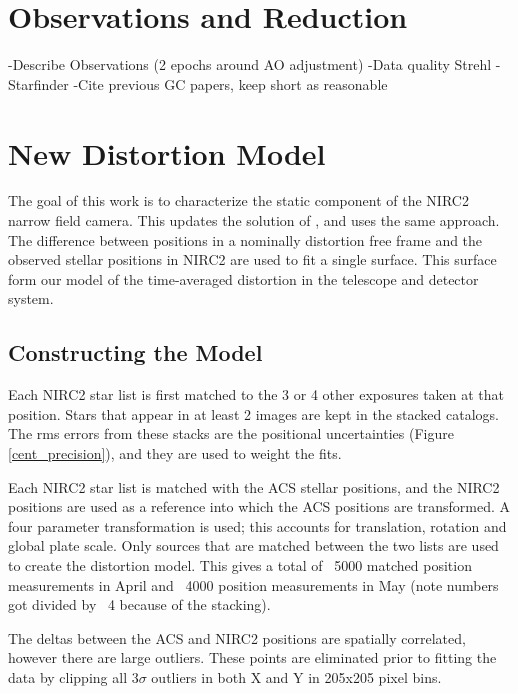 \section{Observations and Reduction}
-Describe Observations (2 epochs around AO adjustment)
-Data quality Strehl
-Starfinder
-Cite previous GC papers, keep short as reasonable

\section{New Distortion Model}
The goal of this work is to characterize the static component of the NIRC2 narrow field camera.  This updates the solution of \cite{Yelda_2010}, and uses the same approach.  The difference between positions in a nominally distortion free frame and the observed stellar positions in NIRC2 are used to fit a single surface.  This surface form our model of the time-averaged distortion  in the telescope and detector system.

\subsection{Constructing the Model}
Each NIRC2 star list is first matched to the 3 or 4 other exposures taken at that position.  Stars that appear in at least 2 images are kept in the stacked catalogs.  The rms errors from these stacks are the positional uncertainties (Figure \ref{cent_precision}), and they are used to weight the fits.

Each NIRC2 star list is matched with the ACS stellar positions, and the NIRC2 positions are used as a reference into which the ACS positions are transformed.  A four parameter transformation is used; this accounts for translation, rotation and global plate scale.  Only sources that are matched between the two lists are used to create the distortion model.    This gives a total of ~5000 matched position measurements in April and ~4000 position measurements in May (note numbers got divided by ~4 because of the stacking).  



The deltas between the ACS and NIRC2 positions are spatially correlated, however there are large outliers.  These points are eliminated prior to fitting the data by clipping all 3$\sigma$ outliers in both X and Y in 205x205 pixel bins.  

